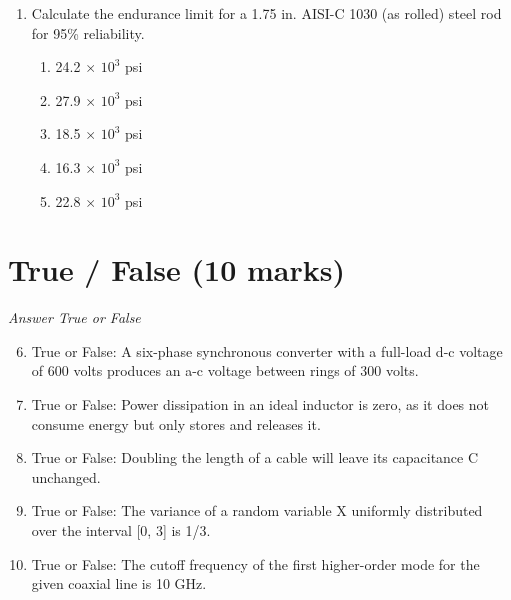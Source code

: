 \documentclass[12pt]{article}
\begin{document}
\begin{enumerate}[label=\arabic*.]
\begin{enumerate}[label=(\alph*)]
    \item h(y) = [2 / \{\ensuremath{\pi}\ensuremath{\surdy}(1 + y)\}]y \textgreater{} 0 and = 0 otherwise
    \item h(y) = [1 / \{\ensuremath{\pi}(1 + $y^2$)\}] for y \textgreater{} 0 and = 0 otherwise
    \item h(y) = [1 / \{2\ensuremath{\pi}(1 + \ensuremath{\sqrt{y}})\}] for y \textgreater{} 0 and = 0 otherwise
    \item h(y) = [1 / \{2\ensuremath{\pi}(1 + $y^2$)\}] for y \textgreater{} 0 and = 0 otherwise
\end{enumerate}
\item Calculate the endurance limit for a 1.75 in. AISI-C 1030 (as rolled) steel rod for 95\% reliability.
\begin{enumerate}[label=(\alph*)]
    \item 24.2 \ensuremath{\times} $10^3$ psi
    \item 27.9 \ensuremath{\times} $10^3$ psi
    \item 18.5 \ensuremath{\times} $10^3$ psi
    \item 16.3 \ensuremath{\times} $10^3$ psi
    \item 22.8 \ensuremath{\times} $10^3$ psi
\end{enumerate}
\end{enumerate}

\section*{True / False (10 marks)}
\textit{Answer True or False}
\begin{enumerate}[label=\arabic*.]
\setcounter{enumi}{5}
\item True or False: A six-phase synchronous converter with a full-load d-c voltage of 600 volts produces an a-c voltage between rings of 300 volts.
\item True or False: Power dissipation in an ideal inductor is zero, as it does not consume energy but only stores and releases it.
\item True or False: Doubling the length of a cable will leave its capacitance C unchanged.
\item True or False: The variance of a random variable X uniformly distributed over the interval [0, 3] is 1/3.
\item True or False: The cutoff frequency of the first higher-order mode for the given coaxial line is 10 GHz.
\end{enumerate}
\end{document}
